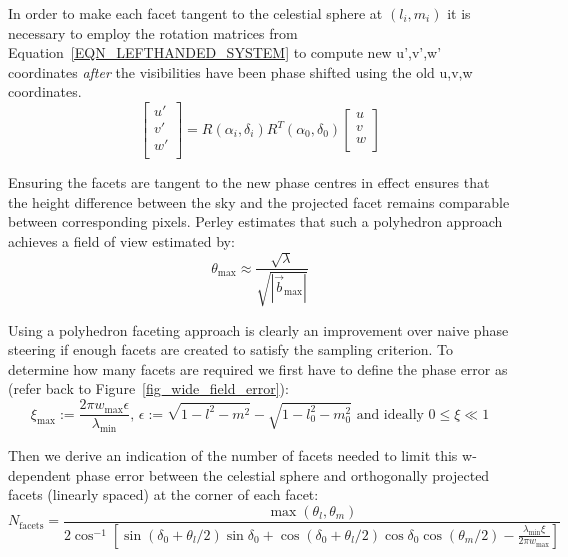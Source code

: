 In order to make each facet tangent to the celestial sphere at $(l_i,m_i)$ it is necessary to employ the rotation matrices from Equation~\ref{EQN_LEFTHANDED_SYSTEM}
to compute new u',v',w' coordinates \emph{after} the visibilities have been phase shifted using the old u,v,w coordinates.
\begin{equation}
 \left[\begin{array}{c}
	u'\\
	v'\\
	w'\\
       \end{array} \right] = R(\alpha_i,\delta_i)R^{T}(\alpha_0,\delta_0)\left[\begin{array}{c}
										u\\
										v \\
										w \\
									      \end{array}
									\right]
\end{equation}

Ensuring the facets are tangent to the new phase centres in effect ensures that the height difference between the sky and the projected facet remains
comparable between corresponding pixels. Perley estimates that such a polyhedron approach achieves a field of view estimated by:
\begin{equation}
 \theta_{\text{max}} \approx \frac{\sqrt{\lambda}}{\sqrt{|\vec{b}_{\text{max}}|}}
\end{equation}

Using a polyhedron faceting approach is clearly an improvement over naive phase steering if enough facets are created to satisfy the sampling 
criterion. To determine how many facets are required we first have to define the phase error as (refer back to Figure~\ref{fig_wide_field_error}):
\begin{equation}
\label{eqn_phase_error}
\xi_{\text{max}}:=\frac{2{\pi}w_{\text{max}}\epsilon}{{\lambda_{\text{min}}}} \text{, }\epsilon:=\sqrt{1-l^2-m^2} - \sqrt{1-l_0^2-m_0^2} \text{ and ideally } 0{\leq\xi\ll}1
\end{equation}

Then we derive an indication of the number of facets needed to limit this w-dependent phase error between the celestial sphere and orthogonally projected 
facets (linearly spaced) at the corner of each facet:
\begin{equation}
N_{\text{facets}} = \frac{\max{(\theta_l,\theta_m)}}{2\cos^{-1}{\left[\sin{(\delta_0 + \theta_l/2)}\sin{\delta_0} + \cos{(\delta_0 + \theta_l/2)}\cos{\delta_0}\cos{(\theta_m/2)}-\frac{\lambda_{\text{min}}\xi}{2{\pi}w_{\text{max}}}\right]}}
\end{equation}

